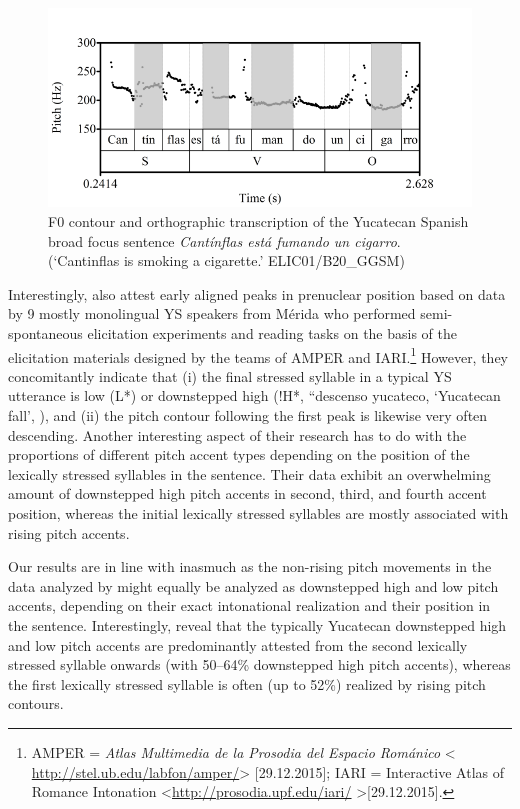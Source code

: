 \documentclass[output=paper]{langsci/langscibook}
\begin{document}
\begin{figure}
\includegraphics[width=\textwidth]{figures/UTH-img39.png}
\caption{F0 contour and orthographic transcription of the Yucatecan Spanish broad focus sentence \textit{Cantínflas está fumando un cigarro}.
(‘Cantinflas is smoking a cigarette.' ELIC01/B20\_GGSM)}
\label{fig:uth:16}
\end{figure}

Interestingly, \citet{MartinButraguenoetal15} also attest early aligned peaks in prenuclear position based on data by 9 mostly monolingual YS speakers from Mérida who performed semi-spontaneous elicitation experiments and reading tasks on the basis of the elicitation materials designed by the teams of AMPER and IARI.\footnote{AMPER = \textit{Atlas Multimedia de la Prosodia del Espacio Románico} < \url{http://stel.ub.edu/labfon/amper/}> [29.12.2015];
IARI = Interactive Atlas of Romance Intonation <\url{http://prosodia.upf.edu/iari/} >[29.12.2015].} However, they concomitantly indicate that (i) the final stressed syllable in a typical YS utterance is low (L*) or downstepped high (!H*, ``descenso yucateco{\textquotedbl}, ‘Yucatecan fall', \citealt{MartinButraguenoetal15}), and (ii) the pitch contour following the first peak is likewise very often descending. Another interesting aspect of their research has to do with the proportions of different pitch accent types depending on the position of the lexically stressed syllables in the sentence. Their data exhibit an overwhelming amount of downstepped high pitch accents in second, third, and fourth accent position, whereas the initial lexically stressed syllables are mostly associated with rising pitch accents. 

Our results are in line with \citet{MartinButraguenoetal15} inasmuch as the non-rising pitch movements in the data analyzed by \citet{Uth16} might equally be analyzed as downstepped high and low pitch accents, depending on their exact intonational realization and their position in the sentence. Interestingly, \citet{MartinButraguenoetal15} reveal that the typically Yucatecan downstepped high and low pitch accents are predominantly attested from the second lexically stressed syllable onwards (with 50--64\% downstepped high pitch accents), whereas the first lexically stressed syllable is often (up to 52\%) realized by rising pitch contours.  
\end{document}
